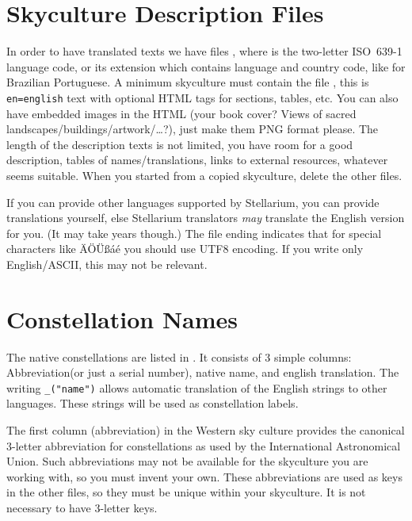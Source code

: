 \section{Skyculture Description Files}
\label{sec:skycultures:description}


In order to have translated texts we have files
, where  is the two-letter
ISO~639-1 language code, or its extension which contains language and
country code, like  for Brazilian Portuguese. A minimum
skyculture must contain the file , this is
\texttt{en=english} text with optional HTML tags for sections, tables,
etc. You can also have embedded images in the HTML (your book cover?
Views of sacred landscapes/buildings/artwork/\ldots?), just make them
PNG format please. The length of the description texts is not limited,
you have room for a good description, tables of names/translations,
links to external resources, whatever seems suitable. When you started
from a copied skyculture, delete the other 
files.

If you can provide other languages supported by Stellarium, you can
provide translations yourself, else Stellarium translators \emph{may}
translate the English version for you. (It may take years though.) The file
ending  indicates that for special characters like ÄÖÜßáé
you should use UTF8 encoding. If you write only English/ASCII, this may not
be relevant.

\section{Constellation Names}
\label{sec:skycultures:constellations}

The native constellations are listed in
. It consists of 3 simple columns:
Abbreviation(or just a serial number), native name, and english
translation. The writing \texttt{\_("name")} allows automatic
translation of the English strings to other languages. These strings
will be used as constellation labels.

The first column (abbreviation) in the Western sky culture provides
the canonical 3-letter abbreviation for constellations as used by the
International Astronomical Union. Such abbreviations may not be
available for the skyculture you are working with, so you must invent
your own. These abbreviations are used as keys in the other files, so
they must be unique within your skyculture.
It is not necessary to have 3-letter keys. 

